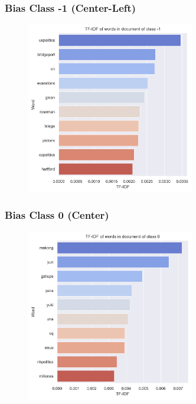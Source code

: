 \documentclass[11pt]{article}
\begin{document}
\subsubsection{Bias Class -1 (Center-Left)}
\begin{center}


\TTTFIDFTable
\begin{figure}[h!]
  \includegraphics[width=0.65\textwidth]{figs/top_ten_tf_idf/tf_idf_word_-1.png}
\end{figure}
\end{center}

\pagebreak

\subsubsection{Bias Class 0 (Center)}
\begin{center}


\TTTFIDFTable
\begin{figure}[h!]
  \includegraphics[width=0.65\textwidth]{figs/top_ten_tf_idf/tf_idf_word_0.png}
\end{figure}
\end{center}
\end{document}
